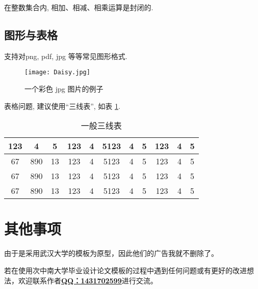 \documentclass[forprint]{CSUBachelor}
\begin{document}
\begin{corollary}
   在整数集合内, 相加、相减、相乘运算是封闭的.
\end{corollary}

\section{图形与表格}

支持对png, pdf, jpg 等等常见图形格式.

\begin{figure}[H]
\centering
\setlength{\abovecaptionskip}{2pt}\setlength{\belowcaptionskip}{10pt}	
  \texttt{[image: Daisy.jpg]}
  \caption{\heiti{}一个彩色 jpg 图片的例子}
  \label{fig:1}
\end{figure}

表格问题, 建议使用``三线表'', 如表 \ref{tab:1}.

\begin{table}[H]
\centering
\caption{\heiti{}一般三线表}
\label{tab:1}
\vspace*{-10pt}	%
    \begin{tabular}{c c c c c c c c c c c}
    \hline
    123 & 4  & 5  & 123 & 4 & 5123 & 4 & 5 & 123 & 4 & 5\\
    \hline
    67 & 890 & 13 & 123 & 4 & 5123 & 4 & 5 & 123 & 4 & 5\\
    67 & 890 & 13 & 123 & 4 & 5123 & 4 & 5 & 123 & 4 & 5\\
    67 & 890 & 13 & 123 & 4 & 5123 & 4 & 5 & 123 & 4 & 5\\
    \hline
    \end{tabular}
\end{table}



\chapter{其他事项}
由于是采用武汉大学的模板为原型，因此他们的广告我就不删除了。

若在使用次中南大学毕业设计论文模板的过程中遇到任何问题或有更好的改进想法，欢迎联系作者{\bf\uline{QQ：1431702599}}进行交流。
\end{document}
